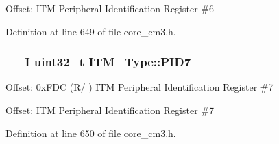Offset\-: I\-T\-M Peripheral Identification Register \#6 

Definition at line 649 of file core\-\_\-cm3.\-h.

\hypertarget{struct_i_t_m___type_aa31ca6bb4b749201321b23d0dbbe0704}{
\subsubsection[{P\-I\-D7}]{\setlength{\rightskip}{0pt plus 5cm}\-\_\-\-\_\-\-I {\bf uint32\-\_\-t} I\-T\-M\-\_\-\-Type\-::\-P\-I\-D7}}\label{struct_i_t_m___type_aa31ca6bb4b749201321b23d0dbbe0704}
Offset\-: 0x\-F\-D\-C (R/ ) I\-T\-M Peripheral Identification Register \#7

Offset\-: I\-T\-M Peripheral Identification Register \#7 

Definition at line 650 of file core\-\_\-cm3.\-h.

